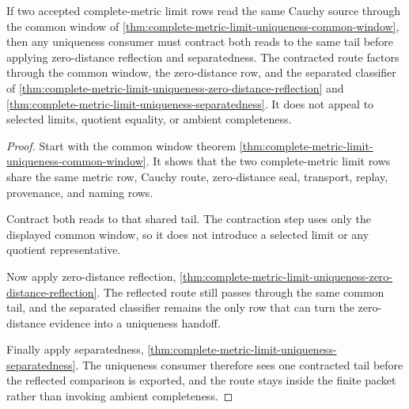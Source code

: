 \begin{theorem}
\label{thm:complete-metric-limit-uniqueness-common-tail-contraction}
If two accepted complete-metric limit rows read the same Cauchy source through the common window of \autoref{thm:complete-metric-limit-uniqueness-common-window}, then any uniqueness consumer must contract both reads to the same tail before applying zero-distance reflection and separatedness. The contracted route factors through the common window, the zero-distance row, and the separated classifier of \autoref{thm:complete-metric-limit-uniqueness-zero-distance-reflection} and \autoref{thm:complete-metric-limit-uniqueness-separatedness}. It does not appeal to selected limits, quotient equality, or ambient completeness.
\end{theorem}
\begin{proof}
Start with the common window theorem \autoref{thm:complete-metric-limit-uniqueness-common-window}. It shows that the two complete-metric limit rows share the same metric row, Cauchy route, zero-distance seal, transport, replay, provenance, and naming rows.

Contract both reads to that shared tail. The contraction step uses only the displayed common window, so it does not introduce a selected limit or any quotient representative.

Now apply zero-distance reflection, \autoref{thm:complete-metric-limit-uniqueness-zero-distance-reflection}. The reflected route still passes through the same common tail, and the separated classifier remains the only row that can turn the zero-distance evidence into a uniqueness handoff.

Finally apply separatedness, \autoref{thm:complete-metric-limit-uniqueness-separatedness}. The uniqueness consumer therefore sees one contracted tail before the reflected comparison is exported, and the route stays inside the finite packet rather than invoking ambient completeness.
\end{proof}

